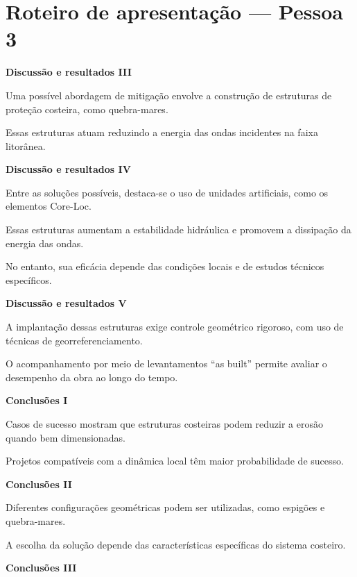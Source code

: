 \documentclass[12pt]{article}
\begin{document}
\section*{Roteiro de apresentação — Pessoa 3}

\textbf{Discussão e resultados III}

Uma possível abordagem de mitigação envolve a construção de estruturas de proteção costeira, como quebra-mares.

Essas estruturas atuam reduzindo a energia das ondas incidentes na faixa litorânea.

\vspace{0.5em}

\textbf{Discussão e resultados IV}

Entre as soluções possíveis, destaca-se o uso de unidades artificiais, como os elementos Core-Loc.

Essas estruturas aumentam a estabilidade hidráulica e promovem a dissipação da energia das ondas.

No entanto, sua eficácia depende das condições locais e de estudos técnicos específicos.

\vspace{0.5em}

\textbf{Discussão e resultados V}

A implantação dessas estruturas exige controle geométrico rigoroso, com uso de técnicas de georreferenciamento.

O acompanhamento por meio de levantamentos “as built” permite avaliar o desempenho da obra ao longo do tempo.

\vspace{0.5em}

\textbf{Conclusões I}

Casos de sucesso mostram que estruturas costeiras podem reduzir a erosão quando bem dimensionadas.

Projetos compatíveis com a dinâmica local têm maior probabilidade de sucesso.

\vspace{0.5em}

\textbf{Conclusões II}

Diferentes configurações geométricas podem ser utilizadas, como espigões e quebra-mares.

A escolha da solução depende das características específicas do sistema costeiro.

\vspace{0.5em}

\textbf{Conclusões III}
\end{document}
